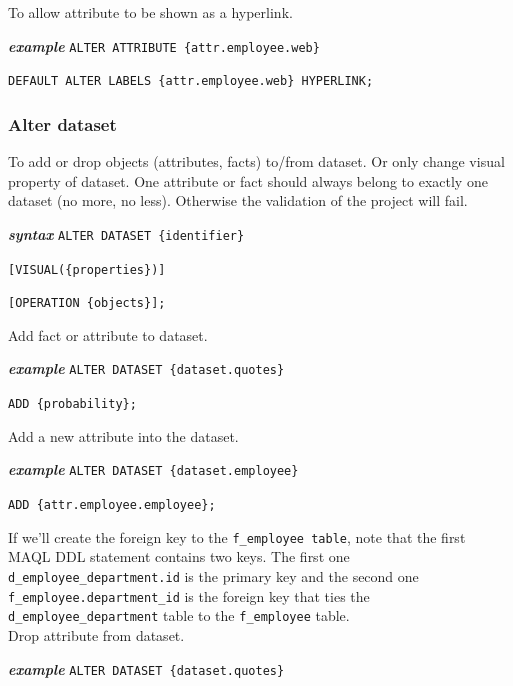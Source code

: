 \documentclass[a4paper, 12pt, titlepage, fleqn]{article}
\begin{document}
\noindent To allow attribute to be shown as a hyperlink.

\textbf{\emph{example}}  \hspace{.9cm}\verb=ALTER ATTRIBUTE {attr.employee.web}=

\hspace{2.5cm}\verb=DEFAULT ALTER LABELS {attr.employee.web} HYPERLINK;=

\subsubsection{Alter dataset}
To add or drop objects (attributes, facts) to/from dataset. Or only change visual property of dataset. One attribute or fact should always belong to exactly one dataset (no more, no less). Otherwise the validation of the project will fail.

\textbf{\emph{syntax}}  \hspace{.9cm}\verb=ALTER DATASET {identifier}=

\hspace{2.2cm}\verb=[VISUAL({properties})]=

\hspace{2.2cm}\verb=[OPERATION {objects}];=

\noindent Add fact or attribute to dataset.

\textbf{\emph{example}}  \hspace{.9cm}\verb=ALTER DATASET {dataset.quotes}=

\hspace{2.5cm}\verb=ADD {probability};=

\noindent Add a new attribute into the dataset.

\textbf{\emph{example}}  \hspace{.9cm}\verb=ALTER DATASET {dataset.employee}=

\hspace{2.5cm}\verb=ADD {attr.employee.employee};=

If we'll create the foreign key to the \verb=f_employee table=, note that the first MAQL DDL statement contains two keys. The first one \verb=d_employee_department.id= is the primary key and the second one \verb=f_employee.department_id= is the foreign key that ties the \verb=d_employee_department= table to the \verb=f_employee= table.\\

\noindent Drop attribute from dataset.

\textbf{\emph{example}}  \hspace{.9cm}\verb=ALTER DATASET {dataset.quotes}=
\end{document}
